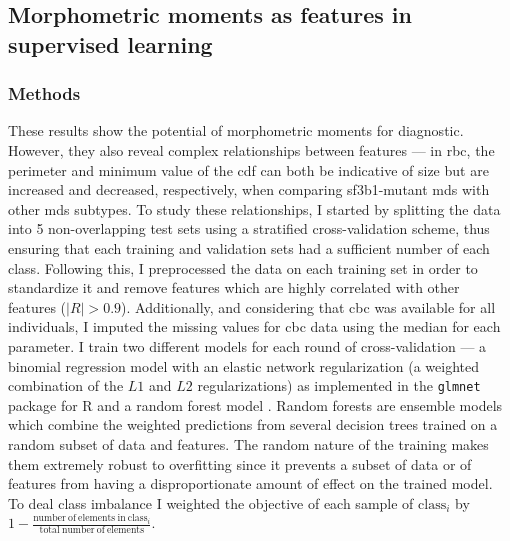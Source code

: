 \subsection{Morphometric moments as features in supervised learning}

\subsubsection{Methods}

These results show the potential of morphometric moments for diagnostic. However, they also reveal complex relationships between features --- in \ac{rbc}, the perimeter and minimum value of the \ac{cdf} can both be indicative of size but are increased and decreased, respectively, when comparing \ac{sf3b1}-mutant \ac{mds} with other \ac{mds} subtypes. To study these relationships, I started by splitting the data into 5 non-overlapping test sets using a stratified cross-validation scheme, thus ensuring that each training and validation sets had a sufficient number of each class. Following this, I preprocessed the data on each training set in order to standardize it and remove features which are highly correlated with other features ($|R|>0.9$). Additionally, and considering that \ac{cbc} was available for all individuals, I imputed the missing values for \ac{cbc} data using the median for each parameter. I train two different models for each round of cross-validation --- a binomial regression model with an elastic network regularization (a weighted combination of the $L1$ and $L2$ regularizations) as implemented in the \texttt{glmnet} package for R \cite{Friedman2010-gl} and a random forest model \cite{Breiman2001-yz}. Random forests are ensemble models which combine the weighted predictions from several decision trees trained on a random subset of data and features. The random nature of the training makes them extremely robust to overfitting since it prevents a subset of data or of features from having a disproportionate amount of effect on the trained model. To deal class imbalance I weighted the objective of each sample of $\mathrm{class}_i$ by $1-\frac{\mathrm{number\ of\ elements\ in\ class}_i}{\mathrm{total\ number\ of\ elements}}$. 

